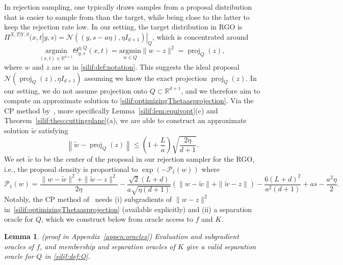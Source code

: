 \documentclass[11pt,letterpaper]{article}
\newcommand{\R}{\mathbb{R}}
\newcommand{\norm}[1]{\left\lVert #1 \right\rVert}
\newcommand{\proj}{\operatorname{proj}}
\newcommand{\argmin}{\mathrm{argmin}  }
\newcommand{\brac}[1]{\left( #1\right)}
\newtheorem{lemma}[thm]{Lemma}
\begin{document}
In rejection sampling, one typically draws samples from a proposal distribution that is easier to sample from than the target, while being close to the latter to keep the rejection rate low. 
In our setting, the target distribution in RGO is $\Pi^{X,T|Y,S}(x,t|y,s) = \mathcal{N} \left((y, s - a\eta),   \eta I_{d+1}\right)|_Q$, which is concentrated around
\begin{equation}
\label{silif:optimizingThetaasprojection}
\underset{(x,t) \in \R^{d+1}}{\argmin}   \Theta^{\eta,Q}_{y,s}(x,t)=\underset{w \in Q}{\argmin}  \big\|w - z\big\|^2 
= \proj_Q(z),
\end{equation}
where $w$ and $z$ are as in \eqref{silif:def:notation}.
This suggests the ideal proposal $\mathcal{N}\left(\proj_Q(z),\eta I_{d+1}\right)$ assuming we know the exact projection $\proj_Q(z)$. In our setting, we do not assume projection onto $Q \subset \R^{d+1}$, and we therefore aim to compute an approximate solution to \eqref{silif:optimizingThetaasprojection}. Via the CP method by~\cite{jiang2020cuttingplane}, more specifically Lemma~\ref{silif:lem:equivopt}(c) and Theorem~\ref{silif:theo:cuttingplane}(a), we are able to construct an approximate solution $\tilde w$ satisfying 
\begin{equation}
\label{silif:difference:tildextildet:mainpaper}
    \norm{\tilde{w}- \proj_Q(z)}\leq \brac{1+\frac{L}{a}}\sqrt{\frac{2\eta}{d+1}}. 
\end{equation}
We set $\tilde{w}$ to be the center of the proposal in our rejection sampler for the RGO, i.e., the proposal density is proportional to $\exp\brac{-\mathcal{P}_1(w)}$ where  
\begin{equation}\label{silif:def:P1}
\mathcal{P}_1(w)
=\frac{\|w-\tilde{w}\|^2+\|\tilde{w}-z\|^2}{2\eta}
-\frac{\sqrt{2}(L+d)}{a\sqrt{\eta (d+1)}}\left(\|w-\tilde{w}\|+\|\tilde{w}-z\|\right)
-\frac{6(L+d)^2}{a^2 (d+1)}+as-\frac{a^2\eta}{2}.
\end{equation}
Notably, the CP method of~\cite{jiang2020cuttingplane} needs (i) subgradients of $\|w-z\|^2$ in~\eqref{silif:optimizingThetaasprojection} (available explicitly) and (ii) a separation oracle for $Q$, which we construct below from oracle access to $f$ and $K$.
\begin{lemma}\label{silif:lem:sep} (proof in Appendix~\ref{appen:oracles})
    Evaluation and subgradient oracles of $f$, and membership and separation oracles of $K$ give a valid separation oracle for $Q$ in \eqref{silif:def:Q}.
\end{lemma}
\end{document}
